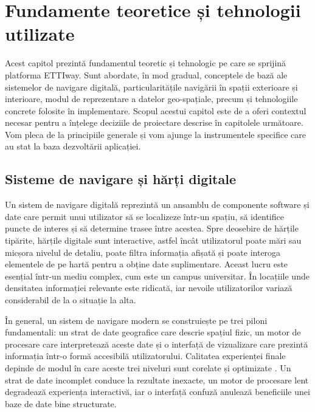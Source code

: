 
\chapter{Fundamente teoretice și tehnologii utilizate}
\label{cap:fundamente}

Acest capitol prezintă fundamentul teoretic și tehnologic pe care se sprijină
platforma ETTIway. Sunt abordate, în mod gradual, conceptele de bază ale
sistemelor de navigare digitală, particularitățile navigării în spații
exterioare și interioare, modul de reprezentare a datelor geo-spațiale, precum
și tehnologiile concrete folosite în implementare. Scopul acestui capitol este
de a oferi contextul necesar pentru a înțelege deciziile de
proiectare descrise în capitolele următoare. Vom pleca de la principiile generale
și vom ajunge la instrumentele specifice care au stat la baza dezvoltării
aplicației.

\section{Sisteme de navigare și hărți digitale}
\label{sec:sisteme-navigare}

Un sistem de navigare digitală reprezintă un ansamblu de componente software și
date care permit unui utilizator să se localizeze într-un spațiu, să
identifice puncte de interes și să determine trasee între acestea. Spre
deosebire de hărțile tipărite, hărțile digitale sunt interactive, astfel încât utilizatorul
poate mări sau micșora nivelul de detaliu, poate filtra informația afișată și
poate interoga elementele de pe hartă pentru a obține date suplimentare. Aceast
lucru este esențial într-un mediu complex, cum este un campus
universitar. În locațiile unde densitatea informației relevante este ridicată, iar nevoile
utilizatorilor variază considerabil de la o situație la alta.

În general, un sistem de navigare modern se construiește pe trei piloni
fundamentali: un strat de date geografice care descrie spațiul fizic, un motor
de procesare care interpretează aceste date și o
interfață de vizualizare care prezintă informația într-o formă accesibilă
utilizatorului. Calitatea experienței finale depinde de modul în care aceste
trei niveluri sunt corelate și optimizate \cite{LuacesGIS}. Un strat de date incomplet conduce
la rezultate inexacte, un motor de procesare lent degradează experiența
interactivă, iar o interfață confuză anulează beneficiile unei baze de date
bine structurate.

